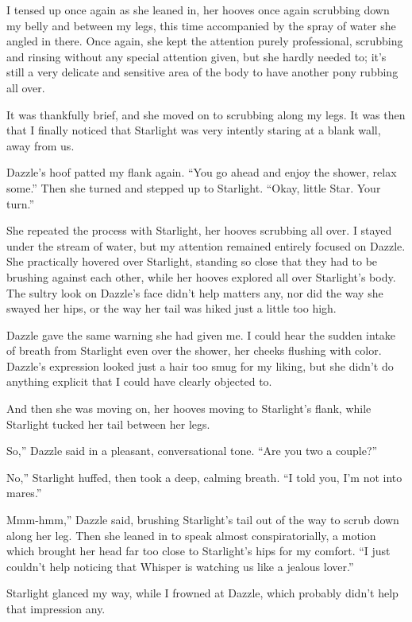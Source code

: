 I tensed up once again as she leaned in, her hooves once again scrubbing down my belly and between my legs, this time accompanied by the spray of water she angled in there. Once again, she kept the attention purely professional, scrubbing and rinsing without any special attention given, but she hardly needed to; it’s still a very delicate and sensitive area of the body to have another pony rubbing all over.

It was thankfully brief, and she moved on to scrubbing along my legs. It was then that I finally noticed that Starlight was very intently staring at a blank wall, away from us.

Dazzle’s hoof patted my flank again. “You go ahead and enjoy the shower, relax some.” Then she turned and stepped up to Starlight. “Okay, little Star. Your turn.”

She repeated the process with Starlight, her hooves scrubbing all over. I stayed under the stream of water, but my attention remained entirely focused on Dazzle. She practically hovered over Starlight, standing so close that they had to be brushing against each other, while her hooves explored all over Starlight’s body. The sultry look on Dazzle’s face didn’t help matters any, nor did the way she swayed her hips, or the way her tail was hiked just a little too high.

Dazzle gave the same warning she had given me. I could hear the sudden intake of breath from Starlight even over the shower, her cheeks flushing with color. Dazzle’s expression looked just a hair too smug for my liking, but she didn’t do anything explicit that I could have clearly objected to.

And then she was moving on, her hooves moving to Starlight’s flank, while Starlight tucked her tail between her legs.

\leavevmode{}So,” Dazzle said in a pleasant, conversational tone. “Are you two a couple?”

\leavevmode{}No,” Starlight huffed, then took a deep, calming breath. “I told you, I’m not into mares.”

\leavevmode{}Mmm-hmm,” Dazzle said, brushing Starlight’s tail out of the way to scrub down along her leg. Then she leaned in to speak almost conspiratorially, a motion which brought her head far too close to Starlight’s hips for my comfort. “I just couldn’t help noticing that Whisper is watching us like a jealous lover.”

Starlight glanced my way, while I frowned at Dazzle, which probably didn’t help that impression any.

